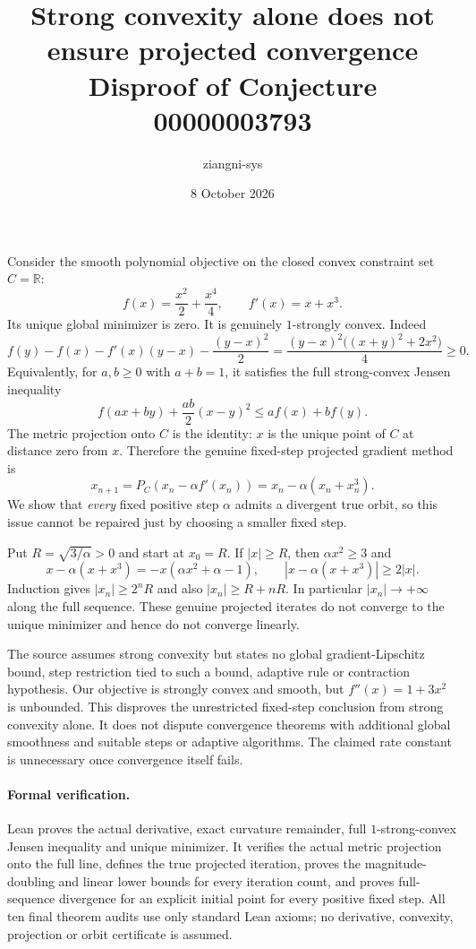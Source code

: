 \documentclass[11pt]{article}
\title{Strong convexity alone does not ensure projected convergence\\Disproof of Conjecture 00000003793}
\author{ziangni-sys}\date{8 October 2026}
\begin{document}
\maketitle
Consider the smooth polynomial objective on the closed convex constraint set $C=\mathbb R$:
\[
 f(x)=\frac{x^2}{2}+\frac{x^4}{4},\qquad f'(x)=x+x^3.
\]
Its unique global minimizer is zero. It is genuinely $1$-strongly convex. Indeed
\[
 f(y)-f(x)-f'(x)(y-x)-\frac{(y-x)^2}{2}
 =\frac{(y-x)^2\bigl((x+y)^2+2x^2\bigr)}4\ge0.
\]
Equivalently, for $a,b\ge0$ with $a+b=1$, it satisfies the full strong-convex Jensen inequality
\[
 f(ax+by)+\frac{ab}{2}(x-y)^2\le af(x)+bf(y).
\]
The metric projection onto $C$ is the identity: $x$ is the unique point of $C$ at distance zero from $x$. Therefore the genuine fixed-step projected gradient method is
\[
 x_{n+1}=P_C(x_n-\alpha f'(x_n))=x_n-\alpha(x_n+x_n^3).
\]
We show that \emph{every} fixed positive step $\alpha$ admits a divergent true orbit, so this issue cannot be repaired just by choosing a smaller fixed step.

Put $R=\sqrt{3/\alpha}>0$ and start at $x_0=R$. If $|x|\ge R$, then $\alpha x^2\ge3$ and
\[
 x-\alpha(x+x^3)=-x(\alpha x^2+\alpha-1),\qquad
 |x-\alpha(x+x^3)|\ge2|x|.
\]
Induction gives $|x_n|\ge2^nR$ and also $|x_n|\ge R+nR$. In particular $|x_n|\to+\infty$ along the full sequence. These genuine projected iterates do not converge to the unique minimizer and hence do not converge linearly.

The source assumes strong convexity but states no global gradient-Lipschitz bound, step restriction tied to such a bound, adaptive rule or contraction hypothesis. Our objective is strongly convex and smooth, but $f''(x)=1+3x^2$ is unbounded. This disproves the unrestricted fixed-step conclusion from strong convexity alone. It does not dispute convergence theorems with additional global smoothness and suitable steps or adaptive algorithms. The claimed rate constant is unnecessary once convergence itself fails.

\paragraph{Formal verification.} Lean proves the actual derivative, exact curvature remainder, full $1$-strong-convex Jensen inequality and unique minimizer. It verifies the actual metric projection onto the full line, defines the true projected iteration, proves the magnitude-doubling and linear lower bounds for every iteration count, and proves full-sequence divergence for an explicit initial point for every positive fixed step. All ten final theorem audits use only standard Lean axioms; no derivative, convexity, projection or orbit certificate is assumed.
\end{document}
